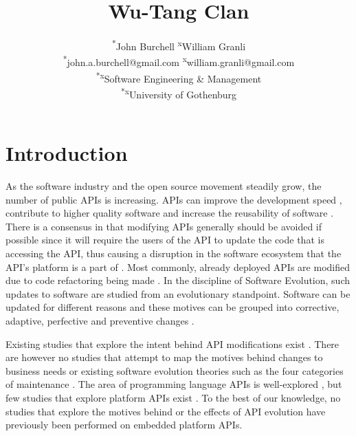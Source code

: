 \documentclass[10pt,twocolumn]{article}
\title{Wu-Tang Clan}
\begin{document}
\author{\textsuperscript{*}John Burchell \qquad \textsuperscript{x}William Granli \\
		\textsuperscript{*}john.a.burchell@gmail.com \qquad \textsuperscript{x}william.granli@gmail.com \\
		\textsuperscript{*x}Software Engineering \& Management  \\
		\textsuperscript{*x}University of Gothenburg }



\maketitle





\section{Introduction}
As the software industry and the open source movement steadily grow, the number of public APIs is increasing. APIs can improve the development speed \cite{stylos2006comparing}, contribute to higher quality software \cite{stylos2006comparing} and increase the reusability of software \cite{afonso2012evaluating}.  There is a consensus in that modifying APIs generally should be avoided if possible \cite{google_talk} \cite{mcdonnell2013empirical} \cite{robbes2012developers} \cite{henning2007api} \cite{robbes2012developers} since it will require the users of the API to update the code that is accessing the API, thus causing a disruption in the software ecosystem that the API's platform is a part of \cite{messerschmitt2005software}. Most commonly, already deployed APIs are modified due to code refactoring being made \cite{dig2005role} \cite{xing2006refactoring}. 
In the discipline of Software Evolution, such updates to software are studied from an evolutionary standpoint. Software can be updated for different reasons and these motives can be grouped into corrective, adaptive, perfective and preventive changes \cite{lientz1980software} \cite{iso}. 

Existing studies that explore the intent behind API modifications exist \cite{hou2011exploring}. There are however no studies that attempt to map the motives behind changes to business needs or existing software evolution theories such as the four categories of maintenance \cite{lientz1980software}. The area of programming language APIs is well-explored \cite{hou2011exploring} \cite{shi2011empirical}, but few studies that explore platform APIs exist \cite{robbes2012developers}. To the best of our knowledge, no studies that explore the motives behind or the effects of API evolution have previously been performed on embedded platform APIs. 
\end{document}
